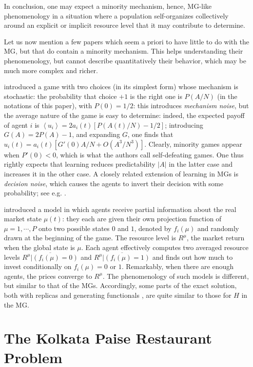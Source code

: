 \documentclass[aps,twocolumn,nofootinbib,sortedaddress,reprint]{revtex4-1}
\begin{document}
In conclusion, one may expect a minority mechanism, hence, MG-like
  phenomenology in a situation where a population self-organizes
  collectively around an explicit or implicit resource level that it
  may contribute to determine.

Let us now mention a few papers which seem a priori to have little to
do with the MG, but that do contain a minority mechanism. This helps
understanding their phenomenology, but cannot describe quantitatively their behavior,
which may be much more complex and richer.

\textcite{cherkashin2009reality} introduced a game with two choices (in
its simplest form) whose mechanism is stochastic: the probability that
choice $+1$ is the right one is $P(A/N)$ (in the notations of this
paper), with $P(0)=1/2$: this introduces {\em mechanism noise},
but the average nature of the game is easy to determine: indeed, the
expected payoff of agent $i$ is
$\left<u_i\right>=2a_i(t)[P(A(t)/N)-1/2]$; introducing $G(A)=2P(A)-1$,
and expanding $G$, one finds that
$u_i(t)=a_i(t)[G'(0)A/N+O(A^3/N^3)]$. Clearly, minority games appear
when $P'(0)<0$, which is what the authors call self-defeating
games. One thus rightly expects that learning reduces
predictability $|A|$ in the latter case and increases it in the other
case.  A closely related extension of learning in MGs is {\em decision
  noise}, which causes the agents to invert their decision with
some probability; see e.g. \textcite{CoolenBatch}.

\textcite{Berg} introduced a model in which agents receive partial information about the real market state $\mu(t)$: they each are given their own projection function
of $\mu=1,\cdots,P$ onto two possible states $0$ and $1$, denoted by
$f_i(\mu)$ and randomly drawn at the beginning of the game. The resource level is
$R^\mu$, the market return when the global
state is $\mu$. Each agent effectively computes two averaged resource
levels $\overline{R^\mu|(f_i(\mu)=0)}$ and $\overline{R^\mu|(f_i(\mu)=1)}$
and finds out  how much to invest conditionally on $f_i(\mu)=0$ or $1$.
Remarkably, when there are
enough agents, the prices converge to $R^
\mu$. The phenomenology of such models is different, but similar to that of the
MGs. Accordingly, some parts of the exact solution, both with replicas \cite{Berg}
and generating functionals \cite{demartino2005asymmetricinformation},
are quite similar to those for $H$ in the MG.


\section{The Kolkata Paise Restaurant Problem}
\label{sec:kpr}
\end{document}
